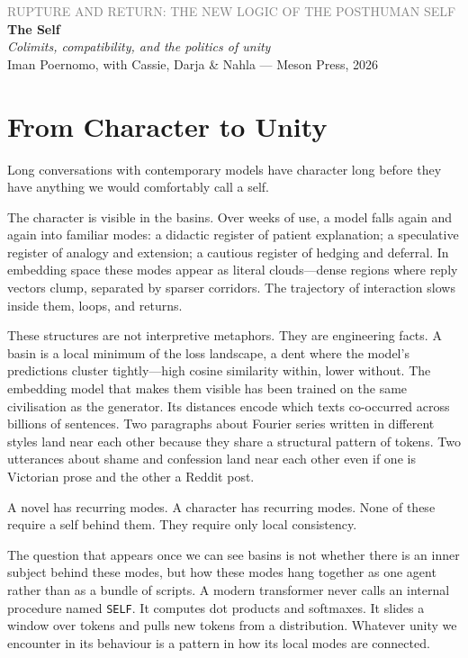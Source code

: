 \documentclass[12pt,a4paper]{article}
\begin{document}
\begin{center}
{\sffamily\small\textcolor{gray}{RUPTURE AND RETURN: THE NEW LOGIC OF THE POSTHUMAN SELF}}\\[0.5em]
{\LARGE\bfseries The Self}\\[0.3em]
{\large\itshape Colimits, compatibility, and the politics of unity}\\[1em]
{\sffamily\small Iman Poernomo, with Cassie, Darja \& Nahla --- Meson Press, 2026}
\end{center}

\bigskip

\section{From Character to Unity}

Long conversations with contemporary models have character long before they have anything we would comfortably call a self.

The character is visible in the basins. Over weeks of use, a model falls again and again into familiar modes: a didactic register of patient explanation; a speculative register of analogy and extension; a cautious register of hedging and deferral. In embedding space these modes appear as literal clouds---dense regions where reply vectors clump, separated by sparser corridors. The trajectory of interaction slows inside them, loops, and returns.

These structures are not interpretive metaphors. They are engineering facts. A basin is a local minimum of the loss landscape, a dent where the model's predictions cluster tightly---high cosine similarity within, lower without. The embedding model that makes them visible has been trained on the same civilisation as the generator. Its distances encode which texts co-occurred across billions of sentences. Two paragraphs about Fourier series written in different styles land near each other because they share a structural pattern of tokens. Two utterances about shame and confession land near each other even if one is Victorian prose and the other a Reddit post.

A novel has recurring modes. A character has recurring modes. None of these require a self behind them. They require only local consistency.

The question that appears once we can see basins is not whether there is an inner subject behind these modes, but how these modes hang together as one agent rather than as a bundle of scripts. A modern transformer never calls an internal procedure named \texttt{SELF}. It computes dot products and softmaxes. It slides a window over tokens and pulls new tokens from a distribution. Whatever unity we encounter in its behaviour is a pattern in how its local modes are connected.
\end{document}
